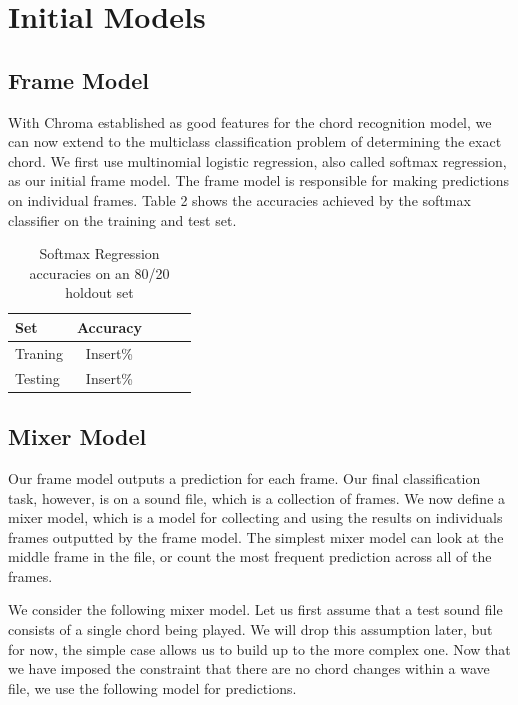 \documentclass{article}
\begin{document}
\section{Initial Models}
\subsection{Frame Model}
With Chroma established as good features for the chord recognition model, we can now extend to the multiclass classification problem of determining the exact chord. We first use multinomial logistic regression, also called softmax regression, as our initial frame model. The frame model is responsible for making predictions on individual frames. Table 2 shows the accuracies achieved by the softmax classifier on the training and test set.
\begin{table}[t]
\caption{Softmax Regression accuracies on an 80/20 holdout set}
\label{mfccvschroma}
\vskip 0.15in
\begin{center}
\begin{small}
\begin{sc}
\begin{tabular}{lcccr}
\hline
\abovespace\belowspace
Set & Accuracy \\
\hline
\abovespace
Traning    & Insert\%\\
Testing & Insert\%\\
\hline
\end{tabular}
\end{sc}
\end{small}
\end{center}
\vskip -0.1in
\end{table}

\subsection{Mixer Model}
Our frame model outputs a prediction for each frame. Our final classification task, however, is on a sound file, which is a collection of frames. We now define a mixer model, which is a model for collecting and using the results on individuals frames outputted by the frame model. The simplest mixer model can look at the middle frame in the file, or count the most frequent prediction across all of the frames.

We consider the following mixer model. Let us first assume that a test sound file consists of a single chord being played. We will drop this assumption later, but for now, the simple case allows us to build up to the more complex one. Now that we have imposed the constraint that there are no chord changes within a wave file, we use the following model for predictions.
\end{document}
